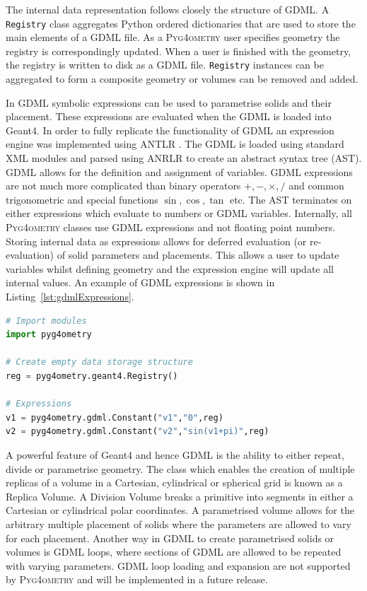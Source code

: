 \documentclass[final,5p,times,twocolumn]{elsarticle}
\newcommand{\PYGEOMETRY}{\textsc{Pyg4ometry}}
\begin{document}
The internal data representation follows closely the structure of GDML. A \verb|Registry| class aggregates Python ordered dictionaries that are  used to store the main 
elements of a GDML file. As a \PYGEOMETRY{} user specifies geometry the registry is correspondingly updated. When a user is finished with the geometry, the registry is written to disk as a GDML file.
\verb|Registry| instances can be aggregated to form a composite geometry or volumes can be removed and added. 

In GDML symbolic expressions can be used to parametrise solids and their placement. These expressions are evaluated when the GDML is loaded into Geant4. 
In order to fully replicate the functionality of GDML an expression engine was implemented using ANTLR \cite{10.5555/2501720}. The GDML is loaded using 
standard XML modules and parsed using ANRLR to create an abstract syntax tree (AST).  GDML allows for the definition 
and assignment of variables. GDML expressions are not much more complicated than binary operators $+, -, \times, /$ and common trigonometric and special functions $\sin, \cos, \tan$ etc. The AST terminates on either expressions which evaluate to numbers or GDML variables. Internally, all \PYGEOMETRY{} 
classes use GDML expressions and not floating point numbers. Storing internal data as expressions allows for deferred evaluation (or re-evaluation) of 
solid parameters and  placements. This allows a user to update variables whilst defining geometry and the expression engine will update all internal values. 
An example of GDML expressions is shown in Listing~\ref{lst:gdmlExpressions}.

\begin{lstlisting}[caption={A simple Python script using \PYGEOMETRY{} to create GDML variables.},label={lst:gdmlExpressions}, language=Python]
# Import modules 
import pyg4ometry

# Create empty data storage structure
reg = pyg4ometry.geant4.Registry()

# Expressions 
v1 = pyg4ometry.gdml.Constant("v1","0",reg)
v2 = pyg4ometry.gdml.Constant("v2","sin(v1+pi)",reg)

\end{lstlisting}

 
A powerful feature of Geant4 and hence GDML is the ability to either repeat, divide or parametrise geometry. The class which enables the creation of 
multiple replicas of a volume in a Cartesian, cylindrical or spherical grid is known as a Replica Volume. A Division Volume breaks a primitive into segments 
in either a Cartesian or cylindrical polar coordinates. A parametrised volume allows for the arbitrary multiple placement of solids where the parameters are 
allowed to vary for each placement.  Another way in GDML to create parametrised solids or volumes is GDML loops, where sections of GDML are allowed 
to be repeated with varying parameters. GDML loop loading and expansion are not supported by \PYGEOMETRY{} and will be implemented in a 
future release.
  
\end{document}
